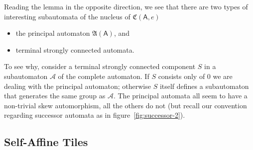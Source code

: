 \documentclass[12pt]{svmult}
\def\cA{\mathcal{A}}
\def\AA{\mathsf{A}}             %
\def\cmpaut{\fC}                %
\def\fA{\mathfrak{A}}
\def\fC{\mathfrak{C}}           %
\begin{document}
Reading the lemma in the opposite direction, we see that there are two types of 
interesting subautomata of the nucleus of $\cmpaut(\AA,e)$ 
%
\begin{itemize}
\item  the principal automaton $\fA(\AA)$, and
\item  terminal strongly connected automata. 
\end{itemize}
%
To see why, consider a terminal strongly connected component $S$ in a subautomaton 
$\cA$ of the complete automaton. 
If $S$ consists only of $0$ we are dealing with the principal automaton;
otherwise $S$ itself defines a subautomaton that generates the same group as $\cA$. 
The principal automata all seem to have a non-trivial skew automorphism, all the 
others do not
(but recall our convention regarding successor automata as in figure~\ref{fig:successor-2}). 



\subsection{Self-Affine Tiles}
\label{sec:self-affine-tiles}
\end{document}
